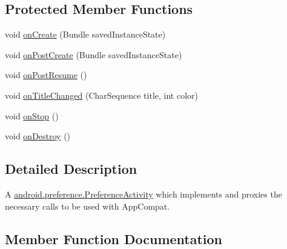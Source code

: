 \subsection*{Protected Member Functions}
\begin{DoxyCompactItemize}
\item 
void \hyperlink{classcom_1_1example_1_1santh_1_1shoppinglist_1_1_app_compat_preference_activity_ad7dc1d3cd1caf48c023cdccb20278f38}{on\+Create} (Bundle saved\+Instance\+State)
\item 
void \hyperlink{classcom_1_1example_1_1santh_1_1shoppinglist_1_1_app_compat_preference_activity_a0c1ac9fcbe62fa6b5cf035fe46300a4b}{on\+Post\+Create} (Bundle saved\+Instance\+State)
\item 
void \hyperlink{classcom_1_1example_1_1santh_1_1shoppinglist_1_1_app_compat_preference_activity_a7bb5ac2ab63490622214ff13dbede839}{on\+Post\+Resume} ()
\item 
void \hyperlink{classcom_1_1example_1_1santh_1_1shoppinglist_1_1_app_compat_preference_activity_ac5fa38dd6673facb57411a7e65870809}{on\+Title\+Changed} (Char\+Sequence title, int color)
\item 
void \hyperlink{classcom_1_1example_1_1santh_1_1shoppinglist_1_1_app_compat_preference_activity_ad4dbca728afaae63f8af58b53a1c31a5}{on\+Stop} ()
\item 
void \hyperlink{classcom_1_1example_1_1santh_1_1shoppinglist_1_1_app_compat_preference_activity_abb6da3f9fb0b275684431b8622945d7c}{on\+Destroy} ()
\end{DoxyCompactItemize}


\subsection{Detailed Description}
A \hyperlink{}{android.\+preference.\+Preference\+Activity} which implements and proxies the necessary calls to be used with App\+Compat. 

\subsection{Member Function Documentation}
